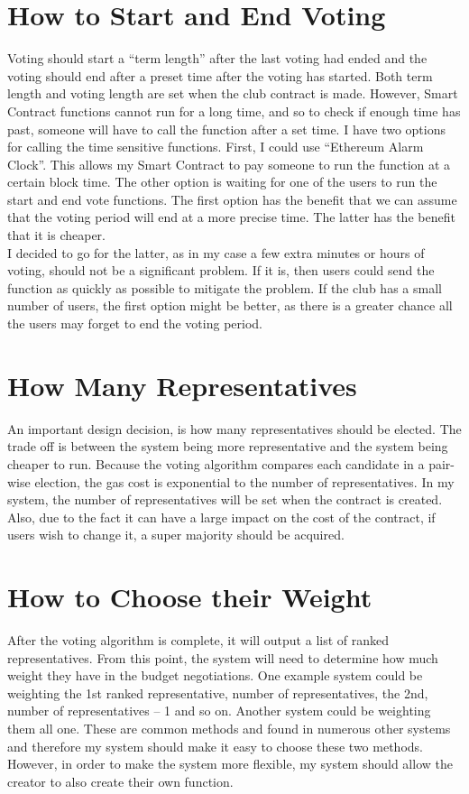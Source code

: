 \section{How to Start and End Voting}
Voting should start a “term length” after the last voting had ended and the voting should end after a preset time after the voting has started. Both term length and voting length are set when the club contract is made. However, Smart Contract functions cannot run for a long time, and so to check if enough time has past, someone will have to call the function after a set time. I have two options for calling the time sensitive functions. First, I could use “Ethereum Alarm Clock”. This allows my Smart Contract to pay someone to run the function at a certain block time. The other option is waiting for one of the users to run the start and end vote functions. The first option has the benefit that we can assume that the voting period will end at a more precise time. The latter has the benefit that it is cheaper.
\\
I decided to go for the latter, as in my case a few extra minutes or hours of voting, should not be a significant problem. If it is, then users could send the function as quickly as possible to mitigate the problem. If the club has a small number of users, the first option might be better, as there is a greater chance all the users may forget to end the voting period.
\section{How Many Representatives}
An important design decision, is how many representatives should be elected. The trade off is between the system being more representative and the system being cheaper to run. Because the voting algorithm compares each candidate in a pair-wise election, the gas cost is exponential to the number of representatives. In my system, the number of representatives will be set when the contract is created. Also, due to the fact it can have a large impact on the cost of the contract, if users wish to change it, a super majority should be acquired.
\section{How to Choose their Weight}
After the voting algorithm is complete, it will output a list of ranked representatives. From this point, the system will need to determine how much weight they have in the budget negotiations. One example system  could be weighting the 1st ranked representative, number of representatives, the 2nd, number of representatives – 1 and so on. Another system could be weighting them all one. These are common methods and found in numerous other systems and therefore my system should make it easy to choose these two methods. However, in order to make the system more flexible, my system should allow the creator to also create their own function.
